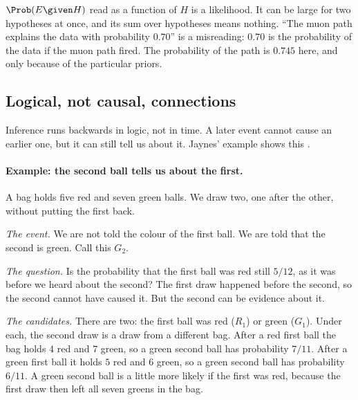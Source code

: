 \begin{pitfall}
$\Prob(E\given H)$ read as a function of $H$ is a likelihood. It can be large for
two hypotheses at once, and its sum over hypotheses means nothing. ``The muon
path explains the data with probability $0.70$'' is a misreading: $0.70$ is the
probability of the data if the muon path fired. The probability of the path is
$0.745$ here, and only because of the particular priors.
\end{pitfall}

\subsection{Logical, not causal, connections}

Inference runs backwards in logic, not in time. A later event cannot cause an
earlier one, but it can still tell us about it. Jaynes' example shows this
.

\paragraph{Example: the second ball tells us about the first.}
A bag holds five red and seven green balls. We draw two, one after the other,
without putting the first back.

\emph{The event.} We are not told the colour of the first ball. We are told that
the second is green. Call this $G_2$.

\emph{The question.} Is the probability that the first ball was red still
$5/12$, as it was before we heard about the second? The first draw happened
before the second, so the second cannot have caused it. But the second can be
evidence about it.

\emph{The candidates.} There are two: the first ball was red ($R_1$) or green
($G_1$). Under each, the second draw is a draw from a different bag. After a red
first ball the bag holds $4$ red and $7$ green, so a green second ball has
probability $7/11$. After a green first ball it holds $5$ red and $6$ green, so a
green second ball has probability $6/11$. A green second ball is a little more
likely if the first was red, because the first draw then left all seven greens
in the bag.

